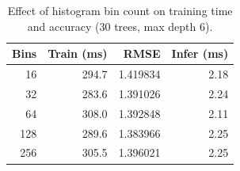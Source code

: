 \begin{table}[h]
\centering
\caption{Effect of histogram bin count on training time and accuracy 
(30 trees, max depth 6).}
\label{tab:bin_ablation}
\begin{tabular}{rrrr}
\toprule
\textbf{Bins} & \textbf{Train (ms)} & \textbf{RMSE} 
& \textbf{Infer (ms)} \\
\midrule
16 & 294.7 & 1.419834 & 2.18 \\
32 & 283.6 & 1.391026 & 2.24 \\
64 & 308.0 & 1.392848 & 2.11 \\
128 & 289.6 & 1.383966 & 2.25 \\
256 & 305.5 & 1.396021 & 2.25 \\
\bottomrule
\end{tabular}
\end{table}